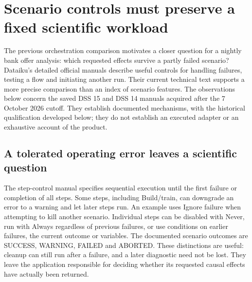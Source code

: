 \section{Scenario controls must preserve a fixed scientific workload}
\label{exec23:dss-scope}

The previous orchestration comparison motivates a closer question for a
nightly bank offer analysis: which requested effects survive a partly failed
scenario? Dataiku's detailed official manuals describe useful controls for
handling failures, testing a flow and initiating another run. Their current
technical text supports a more precise comparison than an index of scenario
features. The observations below concern the saved DSS 15 and DSS 14 manuals
acquired after the 7 October 2026 cutoff. They establish documented mechanisms,
with the historical qualification developed below; they do not establish an
executed adapter or an exhaustive account of the product.
\citep{exec23_dss_latest_flow,exec23_dss_latest_triggers,exec23_dss_latest_steps,
exec23_dss_dss14_flow}

\subsection{A tolerated operating error leaves a scientific question}

The step-control manual specifies sequential execution until the first failure
or completion of all steps. Some steps, including Build/train, can downgrade
an error to a warning and let later steps run. An example uses Ignore failure
when attempting to kill another scenario. Individual steps can be disabled
with Never, run with Always regardless of previous failures, or use conditions
on earlier failures, the current outcome or variables. The documented scenario
outcomes are SUCCESS, WARNING, FAILED and ABORTED. These distinctions are useful:
cleanup can still run after a failure, and a later diagnostic need not be lost.
They leave the application responsible for deciding whether its requested
causal effects have actually been returned.
\citep{exec23_dss_latest_flow,exec23_dss_dss14_flow}


